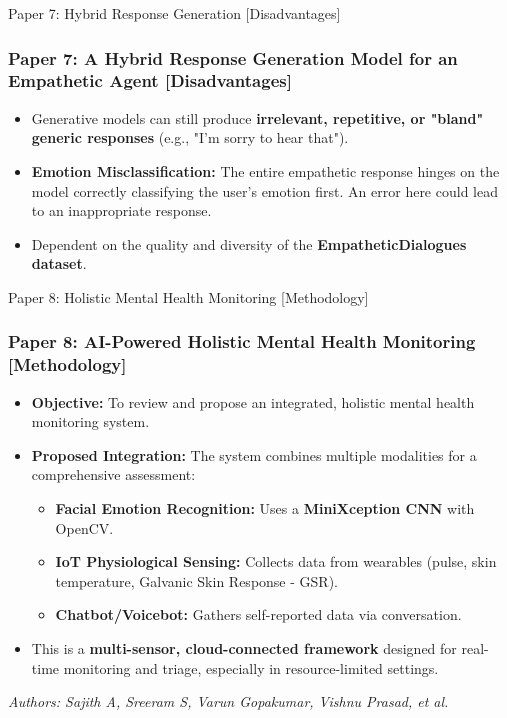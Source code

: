 \documentclass[11pt]{beamer}
\begin{document}
\begin{frame}{Paper 7: Hybrid Response Generation [Disadvantages]}
\frametitle{Paper 7: A Hybrid Response Generation Model for an Empathetic Agent [Disadvantages]}
\begin{itemize}
    \item Generative models can still produce \textbf{irrelevant, repetitive, or "bland" generic responses} (e.g., "I'm sorry to hear that").
    \item \textbf{Emotion Misclassification:} The entire empathetic response hinges on the model correctly classifying the user's emotion first. An error here could lead to an inappropriate response.
    \item Dependent on the quality and diversity of the \textbf{EmpatheticDialogues dataset}.
\end{itemize}
\end{frame}

\begin{frame}{Paper 8: Holistic Mental Health Monitoring [Methodology]}
\frametitle{Paper 8: AI-Powered Holistic Mental Health Monitoring [Methodology]}
\begin{itemize}
    \item \textbf{Objective:} To review and propose an integrated, holistic mental health monitoring system.
    \item \textbf{Proposed Integration:} The system combines multiple modalities for a comprehensive assessment:
    \begin{itemize}
        \item \textbf{Facial Emotion Recognition:} Uses a \textbf{MiniXception CNN} with OpenCV.
        \item \textbf{IoT Physiological Sensing:} Collects data from wearables (pulse, skin temperature, Galvanic Skin Response - GSR).
        \item \textbf{Chatbot/Voicebot:} Gathers self-reported data via conversation.
    \end{itemize}
    \item This is a \textbf{multi-sensor, cloud-connected framework} designed for real-time monitoring and triage, especially in resource-limited settings.
\end{itemize}
\vfill
\small{\textit{Authors: Sajith A, Sreeram S, Varun Gopakumar, Vishnu Prasad, et al.}}
\end{frame}
\end{document}
